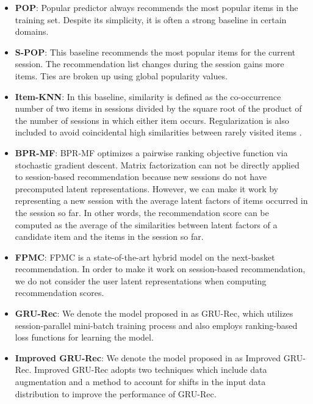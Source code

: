 \documentclass[sigconf]{acmart}
\begin{document}
    \begin{itemize}
  	    \item \textbf{POP}: Popular predictor always recommends the most popular items in the training set. Despite its simplicity, it is often a strong baseline in certain domains.
  	    \item \textbf{S-POP}: This baseline recommends the most popular items for the current session. The recommendation list changes during the session gains more items. Ties are broken up using global popularity values.
  	    \item \textbf{Item-KNN}: In this baseline, similarity is defined as the co-occurrence number of two items in sessions divided by the square root of the product of the number of sessions in which either item occurs. Regularization is also included to avoid coincidental high similarities between rarely visited items \cite{linden2003amazon,davidson2010youtube}.
  	    \item \textbf{BPR-MF}: BPR-MF \cite{rendle2009bpr} optimizes a pairwise ranking objective function via stochastic gradient descent. Matrix factorization can not be directly applied to session-based recommendation because new sessions do not have precomputed latent representations. However, we can make it work by representing a new session with the average latent factors of items occurred in the session so far. In other words, the recommendation score can be computed as the average of the similarities between latent factors of a candidate item and the items in the session so far.
  	    \item \textbf{FPMC}: FPMC \cite{rendle2010factorizing} is a state-of-the-art hybrid model on the next-basket recommendation. In order to make it work on session-based recommendation, we do not consider the user latent representations when computing recommendation scores.
  	    \item \textbf{GRU-Rec}: We denote the model proposed in \cite{hidasi2015session} as GRU-Rec, which utilizes session-parallel mini-batch training process and also employs ranking-based loss functions for learning the model.
  	    \item \textbf{Improved GRU-Rec}: We denote the model proposed in \cite{tan2016improved} as Improved GRU-Rec. Improved GRU-Rec adopts two techniques which include data augmentation and a method to account for shifts in the input data distribution to improve the performance of GRU-Rec.
    \end{itemize}
\end{document}

